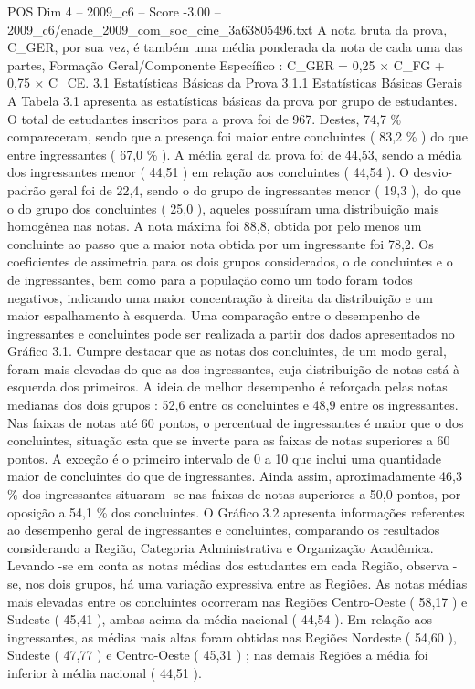 \begin{textsample}{POS Dim 4 – 2009\_c6 – Score -3.00 – 2009\_c6/enade\_2009\_com\_soc\_cine\_3a63805496.txt}
A nota bruta da prova, C\_GER, por sua vez, é também uma média ponderada da nota de cada uma das partes, Formação Geral/Componente Específico : C\_GER = 0,25 × C\_FG + 0,75 × C\_CE. 3.1 Estatísticas Básicas da Prova 3.1.1 Estatísticas Básicas Gerais A Tabela 3.1 apresenta as estatísticas básicas da prova por grupo de estudantes.
O total de estudantes inscritos para a prova foi de 967.
Destes, 74,7 \% compareceram, sendo que a presença foi maior entre concluintes ( 83,2 \% ) do que entre ingressantes ( 67,0 \% ).
A média geral da prova foi de 44,53, sendo a média dos ingressantes menor ( 44,51 ) em relação aos concluintes ( 44,54 ).
O desvio-padrão geral foi de 22,4, sendo o do grupo de ingressantes menor ( 19,3 ), do que o do grupo dos concluintes ( 25,0 ), aqueles possuíram uma distribuição mais homogênea nas notas.
A nota máxima foi 88,8, obtida por pelo menos um concluinte ao passo que a maior nota obtida por um ingressante foi 78,2.
Os coeficientes de assimetria para os dois grupos considerados, o de concluintes e o de ingressantes, bem como para a população como um todo foram todos negativos, indicando uma maior concentração à direita da distribuição e um maior espalhamento à esquerda.
Uma comparação entre o desempenho de ingressantes e concluintes pode ser realizada a partir dos dados apresentados no Gráfico 3.1.
Cumpre destacar que as notas dos concluintes, de um modo geral, foram mais elevadas do que as dos ingressantes, cuja distribuição de notas está à esquerda dos primeiros.
A ideia de melhor desempenho é reforçada pelas notas medianas dos dois grupos : 52,6 entre os concluintes e 48,9 entre os ingressantes.
Nas faixas de notas até 60 pontos, o percentual de ingressantes é maior que o dos concluintes, situação esta que se inverte para as faixas de notas superiores a 60 pontos.
A exceção é o primeiro intervalo de 0 a 10 que inclui uma quantidade maior de concluintes do que de ingressantes.
Ainda assim, aproximadamente 46,3 \% dos ingressantes situaram -se nas faixas de notas superiores a 50,0 pontos, por oposição a 54,1 \% dos concluintes.
O Gráfico 3.2 apresenta informações referentes ao desempenho geral de ingressantes e concluintes, comparando os resultados considerando a Região, Categoria Administrativa e Organização Acadêmica.
Levando -se em conta as notas médias dos estudantes em cada Região, observa -se, nos dois grupos, há uma variação expressiva entre as Regiões.
As notas médias mais elevadas entre os concluintes ocorreram nas Regiões Centro-Oeste ( 58,17 ) e Sudeste ( 45,41 ), ambas acima da média nacional ( 44,54 ).
Em relação aos ingressantes, as médias mais altas foram obtidas nas Regiões Nordeste ( 54,60 ), Sudeste ( 47,77 ) e Centro-Oeste ( 45,31 ) ; nas demais Regiões a média foi inferior à média nacional ( 44,51 ).

\end{textsample}
